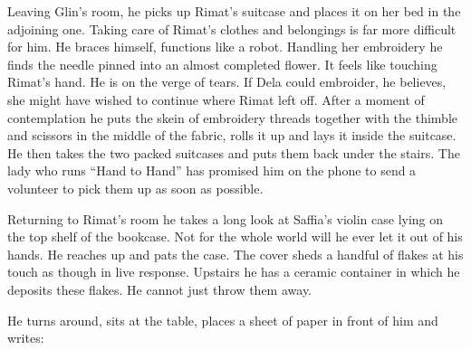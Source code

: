\documentclass[twoside,11pt,openany]{book}
\begin{document}
Leaving Glin's room, he picks up Rimat's suitcase and places it on her bed in the adjoining one. Taking care of Rimat's
clothes and belongings is far more difficult for him. He braces himself, functions like a robot. Handling
her embroidery he finds the needle pinned into an almost completed flower. It feels like touching Rimat's hand. He is
on the verge of tears{.}  If Dela could embroider, he believes, she might
have wished to continue where Rimat left off. After a moment of contemplation he puts the skein
of embroidery  threads together with the thimble and scissors in the middle of the fabric, rolls it up and lays it
inside the suitcase. He then takes the two packed suitcases and puts them back under the stairs. The lady who runs
``Hand to Hand'' has promised him on the phone to send a volunteer to pick them up as soon as
possible.

Returning to Rimat's room he takes a long look at Saffia's violin case lying on the top shelf of the bookcase. Not for
 the whole world will he ever let it out of his hands. He reaches up and
pats the case. The cover sheds a handful of flakes at his touch as though in live response. Upstairs he has a ceramic
container in which he deposits these flakes. He cannot just throw them away.

He turns around, sits at the table, places a sheet of paper in front of him and writes:
\end{document}
